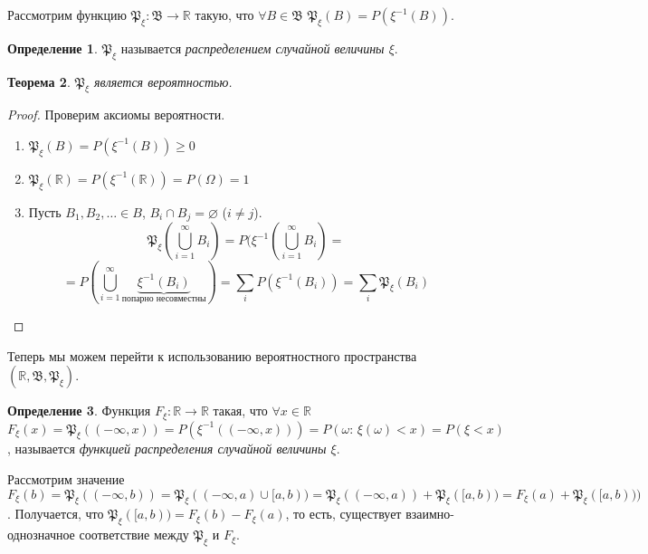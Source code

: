 \documentclass[11pt,openany,a4paper]{scrartcl}
\theoremstyle{plain}
\newtheorem{theorem}{Теорема}[subsection]
\theoremstyle{definition}
\newtheorem{definition}[theorem]{Определение}
\newcommand\mb{\mathbb}
\newcommand\real{\mb R}
\newcommand{\distr}{\mathfrak P_\xi}
\newcommand{\funcdistr}{F_\xi}
\begin{document}
Рассмотрим функцию $\mathfrak P_\xi: \mathfrak B \to \real$ такую, что
$\forall B \in \mathfrak B$ $\mathfrak P_\xi(B) = P(\xi^{-1}(B))$.

\begin{definition}
    $\mathfrak P_\xi$ называется \emph{распределением случайной величины $\xi$}.
\end{definition}
\begin{theorem}
    $\mathfrak P_\xi$ является вероятностью.
\end{theorem}
\begin{proof}
    Проверим аксиомы вероятности.
    \begin{enumerate}
        \item $\distr(B) = P(\xi^{-1}(B)) \geqslant 0$
        \item $\distr (\real) =P(\xi^{-1}(\real)) = P(\Omega) = 1$
        \item Пусть $B_1, B_2, \ldots \in B$, $B_i \cap B_j = \varnothing$
        ($i \neq j$).
        $$
        \distr (\bigcup\limits_{i=1}^\infty B_i) =
        P(\xi^{-1}(\bigcup\limits_{i=1}^\infty B_i) =
        $$
        $$
        = P(\bigcup\limits_{i=1}^\infty \underbrace{\xi^{-1}
        (B_i)}_{\text{попарно несовместны}}) =
        \sum\limits_i P(\xi^{-1}(B_i)) = \sum\limits_i \distr (B_i)
        $$
    \end{enumerate}
\end{proof}

Теперь мы можем перейти к использованию вероятностного пространства
$(\real, \mathfrak B, \distr)$.

\begin{definition}
    Функция $\funcdistr: \real \to \real$ такая, что
    $\forall x\in \real$ $\funcdistr(x) = \distr((-\infty, x)) = 
    P(\xi^{-1}((-\infty, x))) = P(\omega:\, \xi(\omega) < x) = P(\xi < x)$,
    называется \emph{функцией распределения случайной величины $\xi$}.
\end{definition}

Рассмотрим значение $\funcdistr(b) = \distr((-\infty, b)) =
\distr((-\infty, a) \cup [a, b)) = \distr((-\infty,a)) + \distr([a, b)) =
\funcdistr(a) + \distr([a, b)))$. Получается, что
$\distr([a, b)) = \funcdistr(b) - \funcdistr(a)$, то есть,
существует взаимно-однозначное соответствие между $\distr$ и $\funcdistr$.
\end{document}
